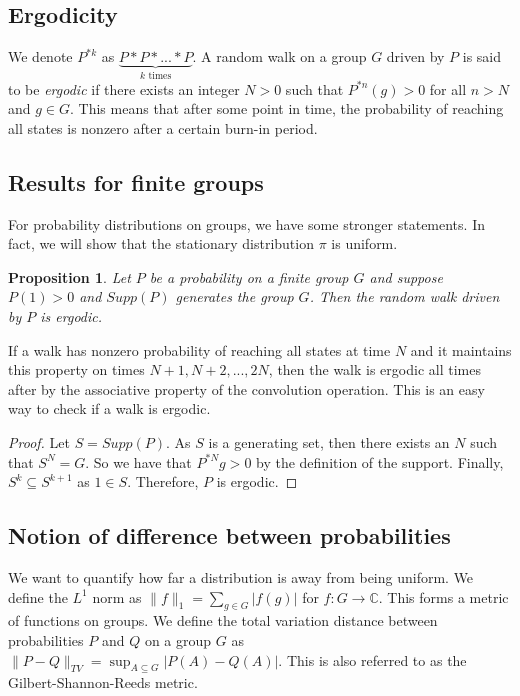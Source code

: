\documentclass[]{article}
\newtheorem{proposition}[theorem]{Proposition}
\theoremstyle{definition}
\numberwithin{theorem}{section}
\numberwithin{equation}{section}
\begin{document}
\subsection{Ergodicity}
We denote $P^{\ast k}$ as $\underbrace{P \ast P \ast ... \ast P}_{k \text{ times}}$. 
A random walk on a group $G$ driven by $P$ is said to be \textit{ergodic} if there exists an integer $N > 0$ such that $P^{\ast n}(g) > 0$ for all $n > N$ and $g \in G$. This means that after some point in time, the probability of reaching all states is nonzero after a certain burn-in period.

\subsection{Results for finite groups}
For probability distributions on groups, we have some stronger statements. In fact, we will show that the stationary distribution $\pi$ is uniform.
\begin{proposition}
	Let $P$ be a probability on a finite group $G$ and suppose $P(1) > 0$ and $Supp(P)$ generates the group $G$. Then the random walk driven by $P$ is ergodic.
\end{proposition}

If a walk has nonzero probability of reaching all states at time $N$ and it maintains this property on times $N+ 1, N + 2 , ..., 2N$, then the walk is ergodic all times after by the associative property of the convolution operation. This is an easy way to check if a walk is ergodic.

\begin{proof}
	Let $S = Supp(P)$. As $S$ is a generating set, then there exists an $N$ such that $S^N = G$. So we have that $P^{\ast N} g > 0$ by the definition of the support. Finally, $S^{k} \subseteq S^{k + 1}$ as $1 \in S$. Therefore, $P$ is ergodic. 
\end{proof}


\subsection{Notion of difference between probabilities}
We want to quantify how far a distribution is away from being uniform. We define the $L^1$ norm as $\|f\|_1 = \sum_{g \in G} |f(g)|$ for $f : G \rightarrow \mathbb{C}$. This forms a metric of functions on groups. 
We define the total variation distance between probabilities $P$ and $Q$ on a group $G$ as $\| P - Q\|_{TV} = \sup_{A \subseteq G} |P(A) - Q(A)|$. This is also referred to as the Gilbert-Shannon-Reeds metric. \cite{diaconisGeneratingRandomPermutation1981} 
\end{document}
